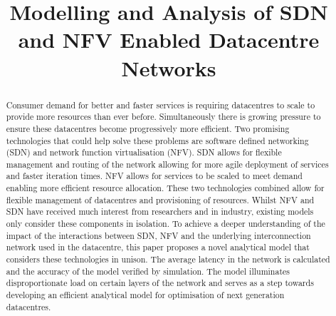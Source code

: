 \documentclass[conference]{IEEEtran}
\begin{document}
\title{Modelling and Analysis of SDN and NFV Enabled Datacentre Networks}

\author{
}
 
\maketitle

\begin{abstract}
Consumer demand for better and faster services is requiring datacentres to scale to provide more resources than ever before. Simultaneously there is growing pressure to ensure these datacentres become progressively more efficient. Two promising technologies that could help solve these problems are software defined networking (SDN) and network function virtualisation (NFV). SDN allows for flexible management and routing of the network allowing for more agile deployment of services and faster iteration times. NFV allows for services to be scaled to meet demand enabling more efficient resource allocation. These two technologies combined allow for flexible management of datacentres and provisioning of resources. Whilst NFV and SDN have received much interest from researchers and in industry, existing models only consider these components in isolation. To achieve a deeper understanding of the impact of the interactions between SDN, NFV and the underlying interconnection network used in the datacentre, this paper proposes a novel analytical model that considers these technologies in unison. The average latency in the network is calculated and the accuracy of the model verified by simulation. The model illuminates disproportionate load on certain layers of the network and serves as a step towards developing an efficient analytical model for optimisation of next generation datacentres.
\end{abstract}
















\end{document}
